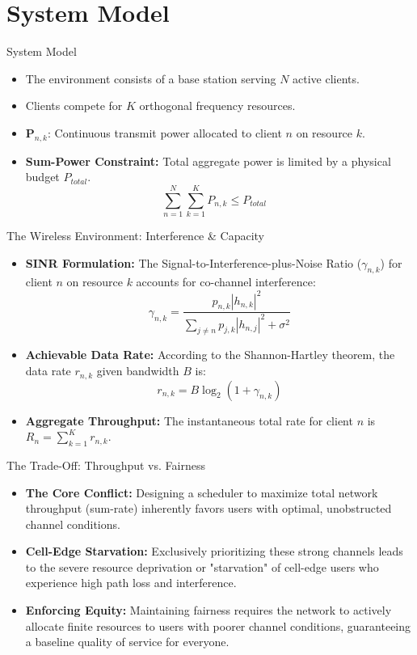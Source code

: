 \documentclass[aspectratio=169]{beamer}
\begin{document}
\section{System Model}

\begin{frame}{System Model}
    \begin{itemize}
            \item The environment consists of a base station serving $N$ active clients.
        \item Clients compete for $K$ orthogonal frequency resources.
        \item $\mathbf{P}_{n,k}$: Continuous transmit power allocated to client $n$ on resource $k$.
        \item \textbf{Sum-Power Constraint:} Total aggregate power is limited by a physical budget $P_{total}$.
        \begin{equation*}
        \sum_{n=1}^{N} \sum_{k=1}^{K} P_{n,k} \le P_{total} \quad
        \end{equation*}
    \end{itemize}
\end{frame}

\begin{frame}{The Wireless Environment: Interference \& Capacity}
    \begin{itemize}
        \item \textbf{SINR Formulation:} The Signal-to-Interference-plus-Noise Ratio ($\gamma_{n,k}$) for client $n$ on resource $k$ accounts for co-channel interference:
        $$\gamma_{n,k} = \frac{p_{n,k} |h_{n,k}|^2}{\sum_{j \neq n} p_{j,k} |h_{n,j}|^2 + \sigma^2}$$
        \item \textbf{Achievable Data Rate:} According to the Shannon-Hartley theorem, the data rate $r_{n,k}$ given bandwidth $B$ is:
        $$r_{n,k} = B \log_2(1 + \gamma_{n,k})$$
        \item \textbf{Aggregate Throughput:} The instantaneous total rate for client $n$ is $R_n = \sum_{k=1}^K r_{n,k}$.
    \end{itemize}
\end{frame}

\begin{frame}{The Trade-Off: Throughput vs. Fairness}
    \begin{itemize}
        \item \textbf{The Core Conflict:} Designing a scheduler to maximize total network throughput (sum-rate) inherently favors users with optimal, unobstructed channel conditions.
        \item \textbf{Cell-Edge Starvation:} Exclusively prioritizing these strong channels leads to the severe resource deprivation or "starvation" of cell-edge users who experience high path loss and interference.
        \item \textbf{Enforcing Equity:} Maintaining fairness requires the network to actively allocate finite resources to users with poorer channel conditions, guaranteeing a baseline quality of service for everyone.
    \end{itemize}
\end{frame}
\end{document}
